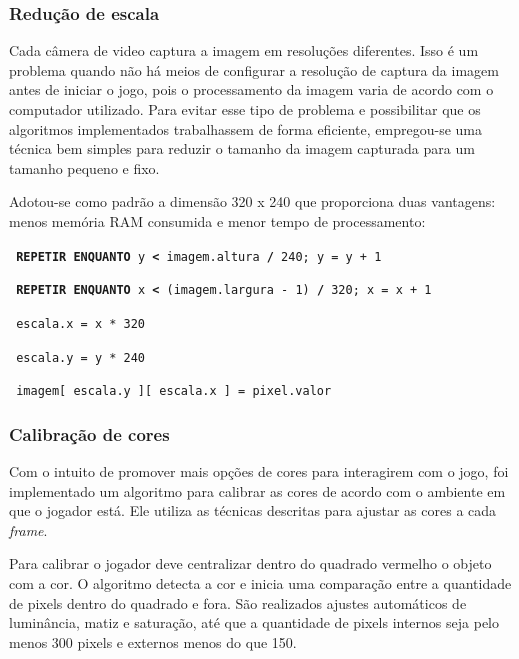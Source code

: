 \documentclass[12pt]{article}
\begin{document}
\subsubsection{Redu\c c\~ao de escala}
Cada c\^amera de video captura a imagem em resolu\c c\~oes diferentes. Isso \'e um problema quando n\~ao h\'a
meios de configurar a resolu\c c\~ao de captura da imagem antes de iniciar o jogo, pois o processamento da imagem
varia de acordo com o computador utilizado. Para evitar esse tipo de problema e possibilitar que os algoritmos implementados
trabalhassem de forma eficiente, empregou-se uma t\'ecnica bem simples para reduzir
o tamanho da imagem capturada para um tamanho pequeno e fixo.
 
Adotou-se como padr\~ao a dimens\~ao 320 x 240 que proporciona duas vantagens: menos mem\'oria RAM consumida
 e menor tempo de processamento:

\noindent \texttt{\footnotesize{ \textbf{REPETIR ENQUANTO} y \textbf{<} imagem.altura \textbf{/} 240; y = y + 1} }

\hspace{0.2cm} \texttt{\footnotesize{ \textbf{REPETIR ENQUANTO} x \textbf{<} (imagem.largura - 1) \textbf{/} 320; x = x + 1}}

\hspace{0.4cm} \texttt{\footnotesize{ escala.x = x * 320}}

\hspace{0.4cm} \texttt{\footnotesize{ escala.y = y * 240}}

\hspace{0.4cm} \texttt{\footnotesize{ imagem[ escala.y ][ escala.x ] = pixel.valor}}

\subsubsection{Calibra\c c\~ao de cores}
Com o intuito de promover mais op\c c\~oes de cores para interagirem com o jogo, foi implementado um
algoritmo para calibrar as cores de acordo com o ambiente em que o jogador est\'a. Ele utiliza as t\'ecnicas
descritas para ajustar as cores a cada \emph{frame}.

Para calibrar o jogador deve centralizar dentro do quadrado vermelho o objeto com a cor. O algoritmo detecta a cor
e inicia uma compara\c c\~ao entre a quantidade de pixels dentro do quadrado e fora. S\~ao realizados ajustes autom\'aticos
de lumin\^ancia, matiz e satura\c c\~ao, at\'e que a quantidade de pixels internos seja pelo menos 300 pixels e externos menos do que 150.
\end{document}
